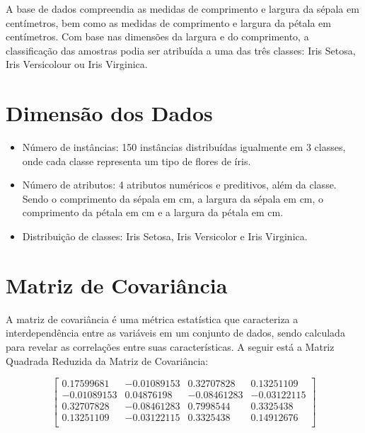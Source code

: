 \documentclass{article}
\begin{document}
A base de dados compreendia as medidas de comprimento e largura da sépala em centímetros, bem como as medidas de comprimento e largura da pétala em centímetros. Com base nas dimensões da largura e do comprimento, a classificação das amostras podia ser atribuída a uma das três classes: Iris Setosa, Iris Versicolour ou Iris Virginica.

\vspace*{1cm}

\section*{Dimensão dos Dados}

\begin{itemize}
\item Número de instâncias: 150 instâncias distribuídas igualmente em 3 classes, onde cada classe representa um tipo de flores de íris.
\item Número de atributos: 4 atributos numéricos e preditivos, além da classe. Sendo o comprimento da sépala em cm, a largura da sépala em cm, o comprimento da pétala em cm e a largura da pétala em cm.
\item Distribuição de classes: Iris Setosa, Iris Versicolor e Iris Virginica.
\end{itemize}

\vspace*{1cm}

\section*{Matriz de Covariância}

A matriz de covariância é uma métrica estatística que caracteriza a interdependência entre as variáveis em um conjunto de dados, sendo calculada para revelar as correlações entre suas características. A seguir está a Matriz Quadrada Reduzida da Matriz de Covariância:

\[
\begin{bmatrix}
0.17599681 & -0.01089153 & 0.32707828 & 0.13251109 \\
-0.01089153 & 0.04876198 & -0.08461283 & -0.03122115 \\
0.32707828 & -0.08461283 & 0.7998544 & 0.3325438 \\
 0.13251109 & -0.03122115 & 0.3325438 & 0.14912676 \\
\end{bmatrix}
\]

\vspace*{1cm}
\end{document}

